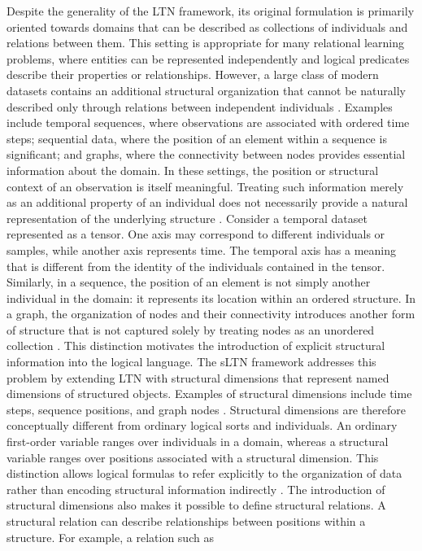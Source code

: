 \noindent
Despite the generality of the LTN framework, its original formulation is primarily oriented towards domains that can be described as collections of individuals and relations between them. This setting is appropriate for many relational learning problems, where entities can be represented independently and logical predicates describe their properties or relationships. However, a large class of modern datasets contains an additional structural organization that cannot be naturally described only through relations between independent individuals \cite{rinaldi2026sltn}.
Examples include temporal sequences, where observations are associated with ordered time steps; sequential data, where the position of an element within a sequence is significant; and graphs, where the connectivity between nodes provides essential information about the domain. In these settings, the position or structural context of an observation is itself meaningful. Treating such information merely as an additional property of an individual does not necessarily provide a natural representation of the underlying structure \cite{rinaldi2026sltn}.
Consider a temporal dataset represented as a tensor. One axis may correspond to different individuals or samples, while another axis represents time. The temporal axis has a meaning that is different from the identity of the individuals contained in the tensor. Similarly, in a sequence, the position of an element is not simply another individual in the domain: it represents its location within an ordered structure. In a graph, the organization of nodes and their connectivity introduces another form of structure that is not captured solely by treating nodes as an unordered collection \cite{rinaldi2026sltn}.
This distinction motivates the introduction of explicit structural information into the logical language. The sLTN framework addresses this problem by extending LTN with structural dimensions that represent named dimensions of structured objects. Examples of structural dimensions include time steps, sequence positions, and graph nodes \cite{rinaldi2026sltn}.
Structural dimensions are therefore conceptually different from ordinary logical sorts and individuals. An ordinary first-order variable ranges over individuals in a domain, whereas a structural variable ranges over positions associated with a structural dimension. This distinction allows logical formulas to refer explicitly to the organization of data rather than encoding structural information indirectly \cite{rinaldi2026sltn}.
The introduction of structural dimensions also makes it possible to define structural relations. A structural relation can describe relationships between positions within a structure. For example, a relation such as

